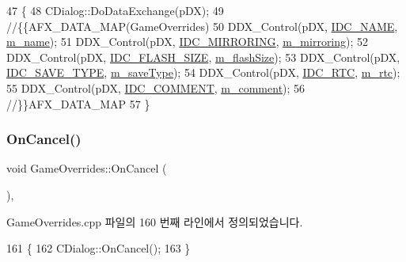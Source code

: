 \begin{DoxyCode}
47 \{
48     CDialog::DoDataExchange(pDX);
49     \textcolor{comment}{//\{\{AFX\_DATA\_MAP(GameOverrides)}
50     DDX\_Control(pDX, \mbox{\hyperlink{resource_8h_a6c7c08c4c5408dc9684d8e4652fadc59}{IDC\_NAME}}, \mbox{\hyperlink{class_game_overrides_a5726c0df72b2d2f43ee641026409f026}{m\_name}});
51     DDX\_Control(pDX, \mbox{\hyperlink{resource_8h_a903d645d2c4e3e505085509ff2d451a6}{IDC\_MIRRORING}}, \mbox{\hyperlink{class_game_overrides_a3aeea798546add267de2b8a59b4d6e0e}{m\_mirroring}});
52     DDX\_Control(pDX, \mbox{\hyperlink{resource_8h_a84501cfbc789fca430acb6ddba36f65f}{IDC\_FLASH\_SIZE}}, \mbox{\hyperlink{class_game_overrides_a3f75d6a84d709bc9052eae826ae4b1c3}{m\_flashSize}});
53     DDX\_Control(pDX, \mbox{\hyperlink{resource_8h_a091f64a3aabedfd21492dd4e459f402b}{IDC\_SAVE\_TYPE}}, \mbox{\hyperlink{class_game_overrides_ac56384b1ec6d9198db961d3d88e5bbc7}{m\_saveType}});
54     DDX\_Control(pDX, \mbox{\hyperlink{resource_8h_a1a806324234a926a0d3cbc94cb3f854f}{IDC\_RTC}}, \mbox{\hyperlink{class_game_overrides_a68ff1f6bae098f28c5f7a30b90141781}{m\_rtc}});
55     DDX\_Control(pDX, \mbox{\hyperlink{resource_8h_a114def9e56caa412524bc5012b03b0f4}{IDC\_COMMENT}}, \mbox{\hyperlink{class_game_overrides_a8fda5a63d4695c79b4bb430717a01daa}{m\_comment}});
56     \textcolor{comment}{//\}\}AFX\_DATA\_MAP}
57 \}
\end{DoxyCode}
\mbox{\label{class_game_overrides_a2bc2c17acb1982dafe3d376c84c369df}} 
\subsubsection{\texorpdfstring{On\+Cancel()}{OnCancel()}}
{\footnotesize\ttfamily void Game\+Overrides\+::\+On\+Cancel (\begin{DoxyParamCaption}{ }\end{DoxyParamCaption})\hspace{0.3cm}{\ttfamily [protected]}, {\ttfamily [virtual]}}



Game\+Overrides.\+cpp 파일의 160 번째 라인에서 정의되었습니다.


\begin{DoxyCode}
161 \{
162   CDialog::OnCancel();
163 \}
\end{DoxyCode}
\mbox{\label{class_game_overrides_a5007baf79bb85e18fc2366b0d82c4e38}} 
